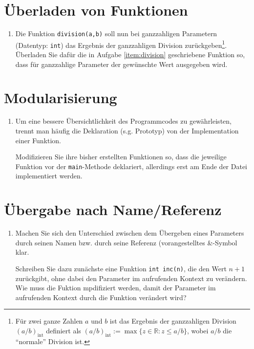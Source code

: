 \documentclass[paper=a4, fontsize=11pt, twoside]{scrartcl}
\begin{document}
\section*{Überladen von Funktionen}\label{sec:uberl-von-funktionen}
\begin{enumerate}[resume]
\item Die Funktion \texttt{division(a,b)} soll nun bei ganzzahligen Parametern (Datentyp: \texttt{int}) das Ergebnis der ganzzahligen Division zurückgeben\footnote{Für zwei ganze Zahlen $a$ und $b$ ist das Ergebnis der ganzzahligen Division $(a/b)_{\mathrm{int}}$ definiert als $(a/b)_{\mathrm{int}}:= \max\{z \in \mathbb{R}:z\le a/b \}$, wobei $a/b$ die ``normale'' Division ist.}. Überladen Sie dafür die in Aufgabe \ref{item:division} geschriebene Funktion so, dass für ganzzahlige Parameter der gewünschte Wert ausgegeben wird. 
\end{enumerate}

\section*{Modularisierung}\label{sec:modularisierung}
\begin{enumerate}[resume]
\item Um eine bessere Übersichtlichkeit des Programmcodes zu gewährleisten, trennt man häufig die Deklaration (s.g. Prototyp) von der Implementation einer Funktion. \par
Modifizieren Sie ihre bisher erstellten Funktionen so, dass die jeweilige Funktion vor der \texttt{main}-Methode deklariert, allerdings erst am Ende der Datei implementiert werden.
\end{enumerate}

\section*{Übergabe nach Name/Referenz}
\begin{enumerate}[resume]
\item Machen Sie sich den Unterschied zwischen dem Übergeben eines Parameters durch seinen Namen bzw. durch seine Referenz (vorangestelltes \textrm{&}-Symbol klar. \par
  Schreiben Sie dazu zunächste eine Funktion \texttt{int inc(n)}, die den Wert $n+1$ zurückgibt, ohne dabei den Parameter im aufrufenden Kontext zu verändern. \\
  Wie muss die Fuktion mpdifiziert werden, damit der Parameter im aufrufenden Kontext durch die Funktion verändert wird? 
\end{enumerate}
\end{document}
